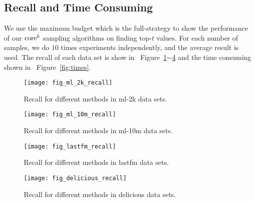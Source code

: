 \documentclass[letterpaper]{article}
\newcommand{\Fig}[1]   {Figure~\ref{fig:#1}}
\newcommand{\Figs}[2]  {Figure~\ref{fig:#1}$\sim$\ref{fig:#2}}
\begin{document}
\subsection{Recall and Time Consuming}
We use the maximum budget which is the full-strategy
to show the performance of our ${\rm core}^k$ sampling algorithms on finding top-$t$ values.
For each number of samples, we do $10$ times experiments independently,
and the average result is used.
The recall of each data set is show in ~\Figs{ml_2k_recall}{delicious_recall}
and the time consuming shown in ~\Fig{times}.
\begin{figure}[H]
  \centering
  \texttt{[image: fig\_ml\_2k\_recall]}\\
  \caption{Recall for different methods in ml-2k data sets.}
  \label{fig:ml_2k_recall}
\end{figure}
\begin{figure}[H]
  \centering
  \texttt{[image: fig\_ml\_10m\_recall]}\\
  \caption{Recall for different methods in ml-10m data sets.}
  \label{fig:ml_10m_recall}
\end{figure}
\begin{figure}[H]
  \centering
  \texttt{[image: fig\_lastfm\_recall]}\\
  \caption{Recall for different methods in lastfm data sets.}
  \label{fig:lastfm_recall}
\end{figure}
\begin{figure}[H]
  \centering
  \texttt{[image: fig\_delicious\_recall]}\\
  \caption{Recall for different methods in delicious data sets.}
  \label{fig:delicious_recall}
\end{figure}
\end{document}
